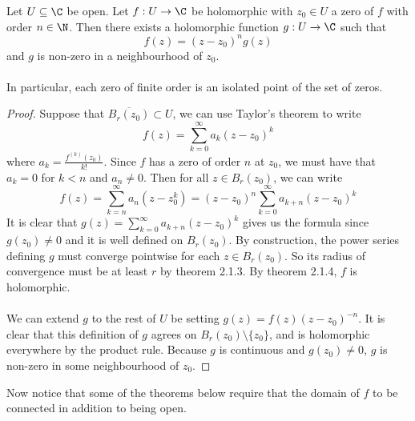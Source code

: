 \documentclass[a4paper]{article}
\begin{document}
\begin{thm}{}{} Let $U\subseteq\C$ be open. Let $f:U\to\C$ be holomorphic with $z_0\in U$ a zero of $f$ with order $n\in\N$. Then there exists a holomorphic function $g:U\to\C$ such that $$f(z)=(z-z_0)^ng(z)$$ and $g$ is non-zero in a neighbourhood of $z_0$. \\~\\

In particular, each zero of finite order is an isolated point of the set of zeros. \tcbline
\begin{proof}
Suppose that $\overline{B_r(z_0)}\subset U$, we can use Taylor's theorem to write $$f(z)=\sum_{k=0}^\infty a_k(z-z_0)^k$$ where $a_k=\frac{f^{(k)}(z_0)}{k!}$. Since $f$ has a zero of order $n$ at $z_0$, we must have that $a_k=0$ for $k<n$ and $a_n\neq 0$. Then for all $z\in B_r(z_0)$, we can write $$f(z)=\sum_{k=n}^\infty a_n(z-z_0^k)=(z-z_0)^n\sum_{k=0}^\infty a_{k+n}(z-z_0)^k$$ It is clear that $g(z)=\sum_{k=0}^\infty a_{k+n}(z-z_0)^k$ gives us the formula since $g(z_0)\neq 0$ and it is well defined on $B_r(z_0)$. By construction, the power series defining $g$ must converge pointwise for each $z\in B_r(z_0)$. So its radius of convergence must be at least $r$ by theorem 2.1.3. By theorem 2.1.4, $f$ is holomorphic. \\~\\

We can extend $g$ to the rest of $U$ be setting $g(z)=f(z)(z-z_0)^{-n}$. It is clear that this definition of $g$ agrees on $B_r(z_0)\setminus\{z_0\}$, and is holomorphic everywhere by the product rule. Because $g$ is continuous and $g(z_0)\neq 0$, $g$ is non-zero in some neighbourhood of $z_0$. 
\end{proof}
\end{thm}

Now notice that some of the theorems below require that the domain of $f$ to be connected in addition to being open. 
\end{document}
